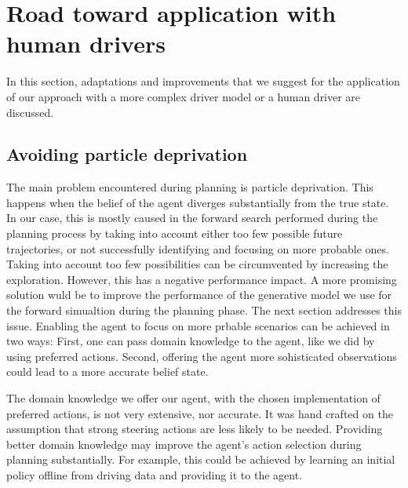 






\section{Road toward application with human drivers}
\label{sec:future}

In this section, adaptations and improvements that we suggest for the application of our approach with a more complex driver model or a human driver are discussed. 

\subsection{Avoiding particle deprivation}

The main problem encountered during planning is particle deprivation. This happens when the belief of the agent diverges substantially from the true state. In our case, this is mostly caused in the forward search performed during the planning process by taking into account either too few possible future trajectories, or not successfully identifying and focusing on more probable ones. Taking into account too few possibilities can be circumvented by increasing the exploration. However, this has a negative performance impact. A more promising solution wuld be to improve the performance of the generative model we use for the forward simualtion during the planning phase. The next section addresses this issue. Enabling the agent to focus on more prbable scenarios can be achieved in two ways: First, one can pass domain knowledge to the agent, like we did by using preferred actions. Second, offering the agent more sohisticated observations could lead to a more accurate belief state.

The domain knowledge we offer our agent, with the chosen implementation of preferred actions, is not very extensive, nor accurate. It was hand crafted on the assumption that strong steering actions are less likely to be needed. Providing better domain knowledge may improve the agent's action selection during planning substantially. For example, this could be achieved by learning an initial policy offline from driving data and providing it to the agent. 

